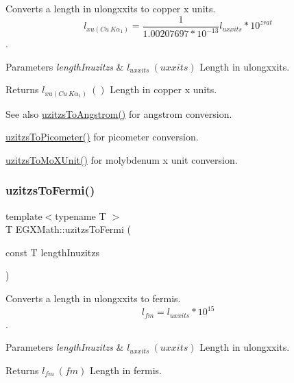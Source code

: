 Converts a length in ulongxxits to copper x units. \[ l_{xu(Cu\ K\alpha_1)}= \frac{1}{1.00207697*10^{-13}} l_{uxxits} * 10^{zrat}\]. 


\begin{DoxyParams}{Parameters}
{\em length\+Inuzitzs} & $ l_{uxxits}\ (uxxits)$ Length in ulongxxits. \\
\hline
\end{DoxyParams}
\begin{DoxyReturn}{Returns}
$ l_{xu(Cu\ K\alpha_1)}\ ()$ Length in copper x units. 
\end{DoxyReturn}
\begin{DoxySeeAlso}{See also}
\mbox{\hyperlink{group___e_g_x_math-_conversions-_length_conversions-_non-_s_i-uzitzs-_non-_s_i_gaaaecee65b1db5abcc71e18526e7073eb}{uzitzs\+To\+Angstrom()}} for angstrom conversion. 

\mbox{\hyperlink{group___e_g_x_math-_conversions-_length_conversions-_non-_s_i-uzitzs-_s_i_ga48c60a4876ac426d1717096263648a4d}{uzitzs\+To\+Picometer()}} for picometer conversion. 

\mbox{\hyperlink{group___e_g_x_math-_conversions-_length_conversions-_non-_s_i-uzitzs-_non-_s_i_ga64b556911b0bb06cf315aa02f5e2d379}{uzitzs\+To\+Mo\+X\+Unit()}} for molybdenum x unit conversion. 
\end{DoxySeeAlso}
\mbox{\label{group___e_g_x_math-_conversions-_length_conversions-_non-_s_i-uzitzs-_non-_s_i_ga920cd8aae6bc9f70faa49a6a5c988040}} 
\subsubsection{\texorpdfstring{uzitzs\+To\+Fermi()}{uzitzsToFermi()}}
{\footnotesize\ttfamily template$<$typename T $>$ \\
T E\+G\+X\+Math\+::uzitzs\+To\+Fermi (\begin{DoxyParamCaption}\item[{const T}]{length\+Inuzitzs }\end{DoxyParamCaption})}



Converts a length in ulongxxits to fermis. \[ l_{fm}=l_{uxxits} * 10^{15} \]. 


\begin{DoxyParams}{Parameters}
{\em length\+Inuzitzs} & $ l_{uxxits}\ (uxxits)$ Length in ulongxxits. \\
\hline
\end{DoxyParams}
\begin{DoxyReturn}{Returns}
$ l_{fm}\ (fm)$ Length in fermis. 
\end{DoxyReturn}
\mbox{\label{group___e_g_x_math-_conversions-_length_conversions-_non-_s_i-uzitzs-_non-_s_i_ga695a8fd8870537930d6378e99ad2aa9f}} 
